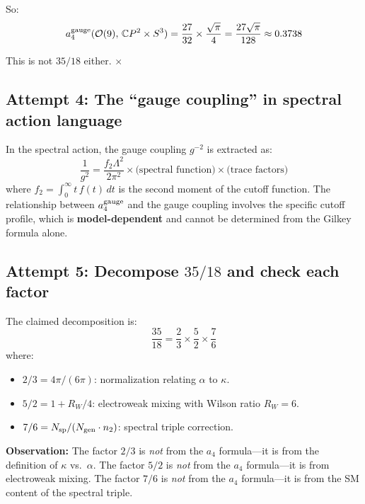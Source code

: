 \documentclass[12pt,a4paper]{article}
\theoremstyle{definition}
\begin{document}
So:
\begin{equation}
a_4^{\rm gauge}(\mathcal{O}(9),\,\mathbb{C}P^2 \times S^3)
= \frac{27}{32} \times \frac{\sqrt{\pi}}{4}
= \frac{27\sqrt{\pi}}{128} \approx 0.3738
\end{equation}

This is not $35/18$ either. $\times$

\subsection{Attempt 4: The ``gauge coupling'' in spectral action language}

In the spectral action, the gauge coupling $g^{-2}$ is extracted as:
\begin{equation}
\frac{1}{g^2} = \frac{f_2\Lambda^2}{2\pi^2} \times
\bigl(\text{spectral function}\bigr) \times
\bigl(\text{trace factors}\bigr)
\end{equation}
where $f_2 = \int_0^\infty t\,f(t)\,dt$ is the second moment of the
cutoff function.  The relationship between $a_4^{\rm gauge}$ and the
gauge coupling involves the specific cutoff profile, which is
\textbf{model-dependent} and cannot be determined from the Gilkey
formula alone.

\subsection{Attempt 5: Decompose $35/18$ and check each factor}

The claimed decomposition is:
\begin{equation}
\frac{35}{18} = \frac{2}{3} \times \frac{5}{2} \times \frac{7}{6}
\end{equation}
where:
\begin{itemize}
\item $2/3 = 4\pi/(6\pi)$: normalization relating $\alpha$ to $\kappa$.
\item $5/2 = 1 + R_W/4$: electroweak mixing with Wilson ratio $R_W = 6$.
\item $7/6 = N_{\rm sp}/(N_{\rm gen} \cdot n_2)$: spectral triple correction.
\end{itemize}

\textbf{Observation:} The factor $2/3$ is \emph{not} from the $a_4$
formula---it is from the definition of $\kappa$ vs.\ $\alpha$.  The
factor $5/2$ is \emph{not} from the $a_4$ formula---it is from
electroweak mixing.  The factor $7/6$ is \emph{not} from the $a_4$
formula---it is from the SM content of the spectral triple.
\end{document}
